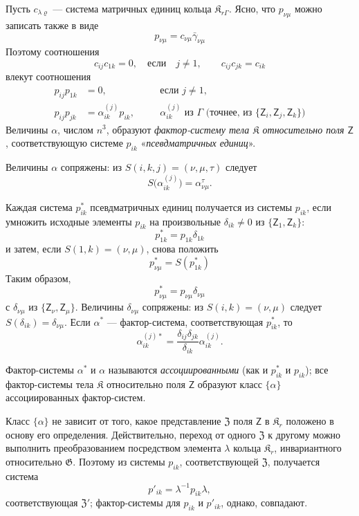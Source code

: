 \documentclass[11pt]{article}
\begin{document}
Пусть \(c_{\lambda\varrho}\) --- система матричных единиц кольца \(\mathfrak K_{r\Gamma}\). Ясно, что \(p_{\nu\mu}\) можно записать также в виде
\[
p_{\nu\mu}=c_{\nu\mu}\bar\gamma_{\nu\mu}
\]
Поэтому соотношения
\[
c_{ij}c_{1k}=0,\quad\text{если}\quad j\ne1,
\qquad
c_{ij}c_{jk}=c_{ik}
\]
влекут соотношения
\[
\begin{aligned}
p_{ij}p_{1k}&=0,\quad &&\text{если }j\ne1,\\
p_{ij}p_{jk}&=\alpha_{ik}^{(j)}p_{ik},\quad
&&\alpha_{ik}^{(j)}\text{ из }\Gamma\text{ (точнее, из }\{\mathsf{Z}_i,\mathsf{Z}_j,\mathsf{Z}_k\}\text{)}
\end{aligned}
\]
Величины \(\alpha\), числом \(n^3\), образуют \emph{фактор-систему тела \(\mathfrak K\) относительно поля \(\mathsf{Z}\)}, соответствующую системе \(p_{ik}\) «\emph{псевдматричных единиц}».

Величины \(\alpha\) сопряжены: из \(S(i,k,j)=(\nu,\mu,\tau)\) следует
\[
S\bigl(\alpha_{ik}^{(j)}\bigr)=\alpha_{\nu\mu}^{\tau}.
\]

Каждая система \(p_{ik}^*\) псевдматричных единиц получается из системы \(p_{ik}\), если умножить исходные элементы \(p_{ik}\) на произвольные \(\delta_{ik}\ne0\) из \(\{\mathsf{Z}_1,\mathsf{Z}_k\}\):
\[
p_{1k}^*=p_{1k}\delta_{1k}
\]
и затем, если \(S(1,k)=(\nu,\mu)\), снова положить
\[
p_{\nu\mu}^*=S(p_{1k}^*)
\]
Таким образом,
\[
p_{\nu\mu}^*=p_{\nu\mu}\delta_{\nu\mu}
\]
с \(\delta_{\nu\mu}\) из \(\{\mathsf{Z}_\nu,\mathsf{Z}_\mu\}\). Величины \(\delta_{\nu\mu}\) сопряжены: из \(S(i,k)=(\nu,\mu)\) следует \(S(\delta_{ik})=\delta_{\nu\mu}\). Если \(\alpha^*\) --- фактор-система, соответствующая \(p_{ik}^*\), то
\[
\alpha_{ik}^{(j)*}=\frac{\delta_{ij}\delta_{jk}}{\delta_{ik}}\alpha_{ik}^{(j)}.
\]

Фактор-системы \(\alpha^*\) и \(\alpha\) называются \emph{ассоциированными} (как и \(p_{ik}^*\) и \(p_{ik}\)); все фактор-системы тела \(\mathfrak K\) относительно поля \(\mathsf{Z}\) образуют класс \(\{\alpha\}\) ассоциированных фактор-систем.

Класс \(\{\alpha\}\) не зависит от того, какое представление \(\mathfrak Z\) поля \(\mathsf{Z}\) в \(\mathfrak K_r\) положено в основу его определения. Действительно, переход от одного \(\mathfrak Z\) к другому можно выполнить преобразованием посредством элемента \(\lambda\) кольца \(\mathfrak K_r\), инвариантного относительно \(\mathfrak G\). Поэтому из системы \(p_{ik}\), соответствующей \(\mathfrak Z\), получается система
\[
p'_{ik}=\lambda^{-1}p_{ik}\lambda,
\]
соответствующая \(\mathfrak Z'\); фактор-системы для \(p_{ik}\) и \(p'_{ik}\), однако, совпадают.
\end{document}
